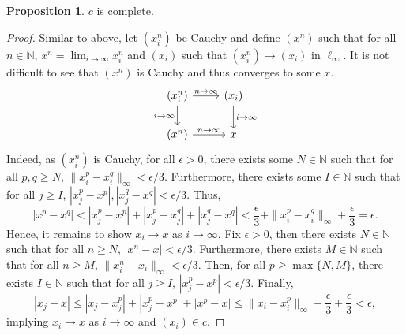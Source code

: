 \documentclass[]{article}
\theoremstyle{definition}
\theoremstyle{definition}
\newtheorem{proposition}{Proposition}[section]
\begin{document}
\begin{proposition}
  \(c\) is complete.
\end{proposition}
\begin{proof}
  Similar to above, let \((x_i^n)\) be Cauchy and define \((x^n)\) such that for 
  all \(n \in \mathbb{N}\), \(x^n = \lim_{i \to \infty} x_i^n\) and  
  \((x_i)\) such that \((x_i^n) \to (x_i)\) in \(\ell_\infty\). It is not 
  difficult to see that \((x^n)\) is Cauchy and thus converges to some \(x\).
  \[\begin{tikzcd}
    (x_i^n) \arrow{r}{n \to \infty} 
    \arrow[swap]{d}{i \to \infty} & (x_i) \arrow{d}{i \to \infty} \\
    (x^n) \arrow{r}{n \to \infty}& x
    \end{tikzcd}\]
  Indeed, as \((x_i^n)\) is Cauchy, for all \(\epsilon > 0\), there exists some 
  \(N \in \mathbb{N}\) such that for all 
  \(p, q \ge N\), \(\|x_i^p - x_i^q\|_\infty < \epsilon / 3\).
  Furthermore, there exists some \(I \in \mathbb{N}\) such that for all 
  \(j \ge I\), \(|x_j^p - x^p|, |x_j^q - x^q| < \epsilon / 3\). Thus, 
  \[|x^p - x^q| < |x_j^p - x^p| + |x_j^p - x_j^q| + |x_j^q - x^q| 
    < \frac{\epsilon}{3} + \|x_i^p - x_i^q\|_\infty + \frac{\epsilon}{3} 
    = \epsilon.\]
  Hence, it remains to show \(x_i \to x\) as \(i \to \infty\). 
  Fix \(\epsilon > 0\), then there exists \(N \in \mathbb{N}\) such that for 
  all \(n \ge N\), \(|x^n - x| < \epsilon / 3\). Furthermore, there exists 
  \(M \in \mathbb{N}\) such that for all \(n \ge M\), 
  \(\|x_i^n - x_i\|_\infty < \epsilon / 3\). Then, for all 
  \(p \ge \max\{N, M\}\), there exists \(I \in \mathbb{N}\) such that 
  for all \(j \ge I\), \(|x_j^p - x^p| < \epsilon / 3\). Finally, 
  \[|x_j - x| \le |x_j - x_j^p| + |x_j^p - x^p| + |x^p - x| \le 
    \|x_i - x_i^p\|_\infty + \frac{\epsilon}{3} + \frac{\epsilon}{3} < \epsilon,\]
  implying \(x_i \to x\) as \(i \to \infty\) and \((x_i) \in c\).
\end{proof}
\end{document}
